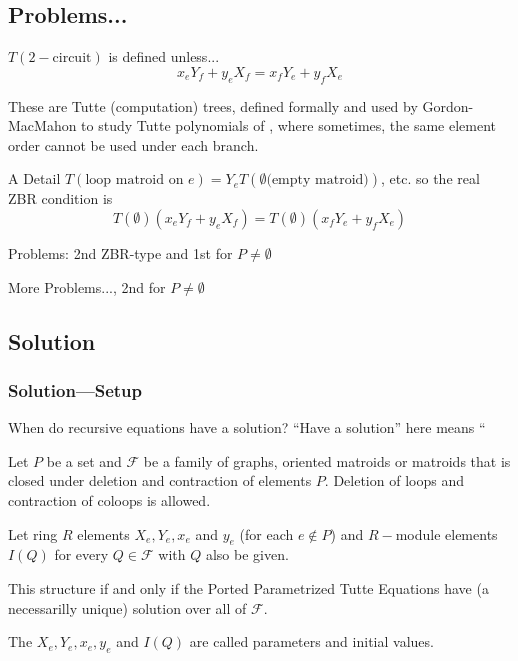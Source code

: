 \documentclass{beamer}
\begin{document}
\subsection{Problems...}

\begin{frame}{$T(2-\text{circuit})$ is  defined unless...}
\[
x_eY_f+y_eX_f=x_fY_e+y_fX_e
\]
\begin{center}\end{center}

These are Tutte (computation) trees, defined formally and
used by Gordon-MacMahon to study Tutte polynomials of
, where sometimes, the same element order
cannot be used under each branch.

\begin{block}{A Detail}
$T(\text{loop matroid on }e) = Y_eT(\emptyset\text{(empty matroid)})$, etc.
so the real ZBR condition is 
\[
T(\emptyset)(x_eY_f+y_eX_f)=T(\emptyset)(x_fY_e+y_fX_e)
\]
\end{block}


\end{frame}

\begin{frame}{Problems: 2nd ZBR-type and 1st for $P\neq\emptyset$}

\end{frame}

\begin{frame}{More Problems..., 2nd for $P\neq\emptyset$}

\end{frame}

\subsection{Solution}
\begin{frame}
\frametitle{Solution---Setup}
\begin{block}{When do recursive equations have a solution?}
``Have a solution'' here means ``
\end{block}

\begin{definition}
Let $P$ be a set and $\mathcal{F}$ be a family of graphs, oriented
matroids or matroids that is closed under deletion and 
contraction of elements
 $P$.  Deletion of loops and contraction of coloops is 
allowed.

Let ring $R$ elements $X_e, Y_e, x_e$ and $y_e$ (for each $e\not\in P$)
and $R-$module elements $I(Q)$ for every $Q\in \mathcal{F}$ 
with $Q$  also be given.

This structure  if and only if
the Ported Parametrized Tutte Equations have (a necessarilly
unique) solution over all of $\mathcal{F}$.
\end{definition}

The $X_e, Y_e, x_e, y_e$ and $I(Q)$ are called parameters and
initial values.
\end{frame}
\end{document}
